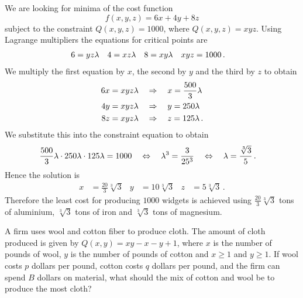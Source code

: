 \begin{solution}
We are looking for minima of the cost function
\[
f(x,y,z) = 6x + 4y + 8z
\]
subject to the constraint $Q(x,y,z) = 1000$, where
$Q(x,y,z) = xyz$.
Using Lagrange multipliers the equations for critical points are
\begin{align*}
6 &= yz\lambda &
4 &= xz \lambda &
8 &= xy \lambda &
xyz &= 1000\,.
\end{align*}
We multiply the first equation by $x$, the second by $y$ and the third by $z$ to obtain
\begin{align*}
6x &= xyz \lambda \quad\Rightarrow\quad x = \frac{500}3 \lambda \\
4y &= xyz \lambda \quad\Rightarrow\quad y = 250 \lambda \\
8z &= xyz \lambda \quad\Rightarrow\quad z = 125 \lambda\,.
\end{align*}
We substitute this into the constraint equation to obtain
\begin{align*}
\frac{500}3 \lambda \cdot 250\lambda \cdot 125 \lambda &= 1000
\quad\Leftrightarrow\quad
\lambda^3 = \frac{3}{25^3} 
\quad\Leftrightarrow\quad
\lambda = \frac{\sqrt[3]{3}}5\,.
\end{align*}
Hence the solution is
\begin{align*}
x &= \frac{20}3 \sqrt[3]{3} &
y &= 10 \sqrt[3]{3} &
z &= 5 \sqrt[3]{3}\,.
\end{align*}
Therefore the least cost for producing $1000$ widgets is achieved using $\frac{20}3 \sqrt[3]{3}$ tons of aluminium, $\sqrt[3]{3}$ tons of iron and $\sqrt[3]{3}$ tons of magnesium.
\end{solution}

\begin{question}
A firm uses wool and cotton fiber to produce cloth. The amount of cloth produced is given by $Q(x,y) = xy-x-y+1$, where $x$ is the number of pounds of wool, $y$ is the number of pounds of cotton and $x \geq 1$ and $y \geq 1$. If wool costs $p$ dollars per pound, cotton costs $q$ dollars per pound, and the firm can spend $B$ dollars on material, what should the mix of cotton and wool be to produce the most cloth?
\end{question}

